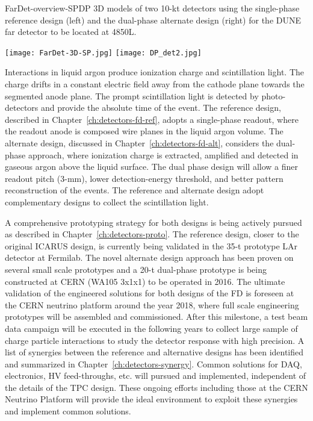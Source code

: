 \begin{cdrfigure}{FarDet-overview-SPDP}
{3D models of two 10-kt detectors using the single-phase reference design (left) 
and the dual-phase alternate design (right) for the DUNE far detector to be 
located at 4850L.}
\centering
\begin{minipage}[b]{1.0\textwidth}
\begin{center}
\texttt{[image: FarDet-3D-SP.jpg]}
\texttt{[image: DP\_det2.jpg]}
\end{center}
\end{minipage}
\end{cdrfigure}

Interactions in liquid argon produce ionization charge and
scintillation light.  The charge drifts in a constant electric field
away from the cathode plane towards the segmented anode plane.  The
prompt scintillation light is detected by photo-detectors and provide
the absolute time of the event.  The reference design, described in
Chapter~\ref{ch:detectors-fd-ref}, adopts a single-phase readout,
where the readout anode is composed wire planes in the liquid argon
volume.  The alternate design, discussed in
Chapter~\ref{ch:detectors-fd-alt}, considers the dual-phase approach,
where ionization charge is extracted, amplified and detected in
gaseous argon above the liquid surface.  The dual phase design will
allow a finer readout pitch (3-mm), lower detection-energy threshold,
and better pattern reconstruction of the events.  The reference and
alternate design adopt complementary designs to collect the
scintillation light.

A comprehensive prototyping strategy for both designs is being actively
pursued as described in Chapter~\ref{ch:detectors-proto}.  The
reference design, closer to the original ICARUS design, is currently
being validated in the 35-t prototype LAr detector at Fermilab.  The
novel alternate design approach has been proven on
several small scale prototypes and a 20-t dual-phase
prototype is being constructed at CERN (WA105 3x1x1) to be
operated in 2016.  The ultimate validation of the engineered solutions
for both designs of the FD is foreseen at the CERN neutrino platform
around the year 2018, where full scale engineering prototypes will be
assembled and commissioned. After this milestone, a test beam data
campaign will be executed in the following years to collect large
sample of charge particle interactions to study the detector response
with high precision. A list of synergies
between the reference and alternative designs has been identified and
summarized in Chapter~\ref{ch:detectors-synergy}. Common solutions for
DAQ, electronics, HV feed-throughs, etc. will pursued and
implemented, independent of the details of the TPC design. These ongoing
efforts including those at the CERN Neutrino Platform will provide the ideal
environment to exploit these synergies and implement common solutions.

